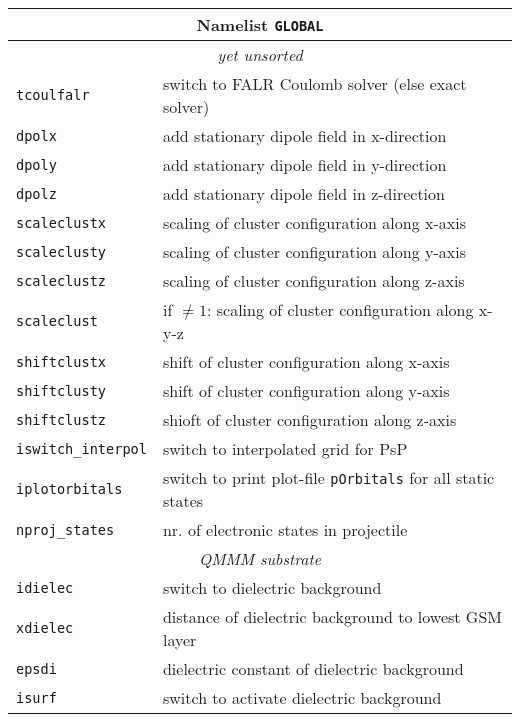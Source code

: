 \documentclass[12pt]{article}
\begin{document}
\begin{tabular}{ll}
\hline
\multicolumn{2}{c}{Namelist {\tt GLOBAL}} in {\tt for005.<name>} \\
\hline
\multicolumn{2}{c}{\it yet unsorted} \\
\hline
{\tt tcoulfalr} & switch to FALR Coulomb solver (else exact solver)  \\
{\tt dpolx} & add stationary dipole field in x-direction  \\
{\tt dpoly} & add stationary dipole field in y-direction    \\
{\tt dpolz} & add stationary dipole field in z-direction    \\
{\tt scaleclustx} & scaling of cluster configuration along x-axis  \\
{\tt scaleclusty} & scaling of cluster configuration along y-axis   \\
{\tt scaleclustz} & scaling of cluster configuration along z-axis   \\
{\tt scaleclust} & if $\neq 1$: scaling of cluster configuration along x-y-z  \\
{\tt shiftclustx} & shift of cluster configuration along x-axis  \\
{\tt shiftclusty} & shift of cluster configuration along y-axis  \\
{\tt shiftclustz} & shioft of cluster configuration along z-axis  \\
{\tt iswitch\_interpol} &  switch to interpolated grid for PsP \\
{\tt iplotorbitals} & switch to print plot-file {\tt pOrbitals} for
all static states \\
{\tt nproj\_states} &  nr. of electronic states in projectile \\
\hline
\multicolumn{2}{c}{\it QMMM substrate} \\
\hline
{\tt idielec } & switch to dielectric background  \\
{\tt xdielec } & distance of dielectric background to lowest GSM layer \\
{\tt epsdi } & dielectric constant of  dielectric background \\
{\tt isurf } & switch to activate  dielectric background  \\
\hline
\end{tabular}

\newpage
\end{document}
